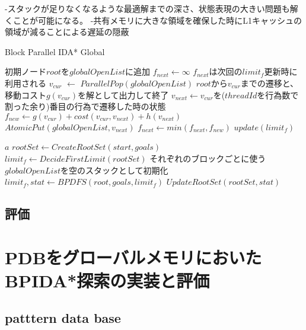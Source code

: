 \documentclass[a4paper,11pt,oneside,openany]{jsbook}
\begin{document}
-スタックが足りなくなるような最適解までの深さ、状態表現の大きい問題も解くことが可能になる。
-共有メモリに大きな領域を確保した時にL1キャッシュの領域が減ることによる遅延の隠蔽


\newpage
\begin{algorithm}
\caption{Block Parallel IDA* Global}
\label{alg:pbnf}
\begin{algorithmic}[1]
    \State 初期ノード$root$を$globalOpenList$に追加
    \State $f_{next} \leftarrow \infty$
    \State $f_{next}$は次回の$limit_f$更新時に利用される 
        \State $v_{cur}$ $\leftarrow$ ${ParallelPop}(globalOpenList)$
            \State $root$から$v_{cur}$までの遷移と、移動コスト$g(v_{cur})$を解として出力して終了
        \EndIf
        \State $v_{next} \gets $$v_{cur}$を($threadId$を行為数で割った余り)番目の行為で遷移した時の状態
        \State $f_{new} \leftarrow g(v_{cur}) + cost(v_{cur}, v_{next}) + h(v_{next})$
            \State ${AtomicPut}(globalOpenList, v_{next})$ 
        \Else
            \State $f_{next} \leftarrow min(f_{next}, f_{new})$
        \EndIf
    \EndWhile
    \State $update(limit_f)$

    \State \Return $a$
\EndFunction
{}
    \State $rootSet \gets {CreateRootSet}(start, goals)$
    \State $limit_f \leftarrow {DecideFirstLimit}(rootSet)$
    \State それぞれのブロックごとに使う$globalOpenList$を空のスタックとして初期化
            \State $limit_f, stat \gets {BPDFS}(root, goals, limit_f)$
        \EndParallelForByBlocks
        \State $UpdateRootSet(rootSet, stat)$
    \EndWhile
\EndFunction

\end{algorithmic}
\end{algorithm}
\newpage

\section{評価}


\chapter{PDBをグローバルメモリにおいたBPIDA*探索の実装と評価}
\section{patttern data base}
\end{document}

